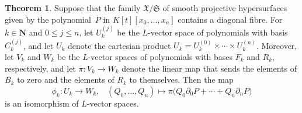 \documentclass[a4paper,11pt]{article}
\numberwithin{equation}{section}
\newcommand{\NN}{\mathbf{N}} %
\renewcommand{\to}{\rightarrow}        %
\theoremstyle{definition}
\newtheorem{thm}{Theorem}[section]
\begin{document}
\begin{thm} \label{thm:Isomorphism}
Suppose that the family $\mathfrak{X}/\mathfrak{S}$ of smooth projective
hypersurfaces given by the polynomial~$P$ in $K[t][x_0, \dotsc, x_n]$ contains 
a diagonal fibre.  For $k \in \NN$ and $0 \leq j \leq n$, let $U_k^{(j)}$ be 
the $L$-vector space of polynomials with basis $C_k^{(j)}$, and let $U_k$ 
denote the cartesian product $U_k = U_k^{(0)} \times \dotsb \times U_k^{(n)}$. 
Moreover, let $V_k$ and $W_k$ be the $L$-vector spaces of polynomials with 
bases $F_k$ and $R_k$, respectively, and let $\pi \colon V_k \rightarrow W_k$ 
denote the linear map that sends the elements of $B_k$ to zero and the 
elements of $R_k$ to themselves. %
Then the map 
\begin{equation}
\phi_k \colon U_k \to W_k, \; \; \;
(Q_0, \dotsc, Q_n) \mapsto \pi \bigl( Q_0 \partial_0 P + \dotsb + Q_n \partial_n P \bigr)
\end{equation}
is an isomorphism of $L$-vector spaces.
\end{thm}
\end{document}
